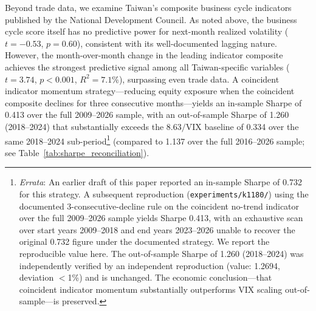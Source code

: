 Beyond trade data, we examine Taiwan's composite business cycle indicators published by the National Development Council. As noted above, the business cycle score itself has no predictive power for next-month realized volatility ($t = -0.53$, $p = 0.60$), consistent with its well-documented lagging nature. However, the month-over-month change in the leading indicator composite achieves the strongest predictive signal among all Taiwan-specific variables ($t = 3.74$, $p < 0.001$, $R^2 = 7.1\%$), surpassing even trade data. A coincident indicator momentum strategy---reducing equity exposure when the coincident composite declines for three consecutive months---yields an in-sample Sharpe of 0.413 over the full 2009--2026 sample, with an out-of-sample Sharpe of 1.260 (2018--2024) that substantially exceeds the $8.63/\text{VIX}$ baseline of 0.334 over the same 2018--2024 sub-period\footnote{\textit{Errata}: An earlier draft of this paper reported an in-sample Sharpe of 0.732 for this strategy. A subsequent reproduction (\texttt{experiments/k1180/}) using the documented 3-consecutive-decline rule on the coincident no-trend indicator over the full 2009--2026 sample yields Sharpe 0.413, with an exhaustive scan over start years 2009--2018 and end years 2023--2026 unable to recover the original 0.732 figure under the documented strategy. We report the reproducible value here. The out-of-sample Sharpe of 1.260 (2018--2024) was independently verified by an independent reproduction (value: 1.2694, deviation $<$1\%) and is unchanged. The economic conclusion---that coincident indicator momentum substantially outperforms VIX scaling out-of-sample---is preserved.} (compared to 1.137 over the full 2016--2026 sample; see Table~\ref{tab:sharpe_reconciliation}).%

